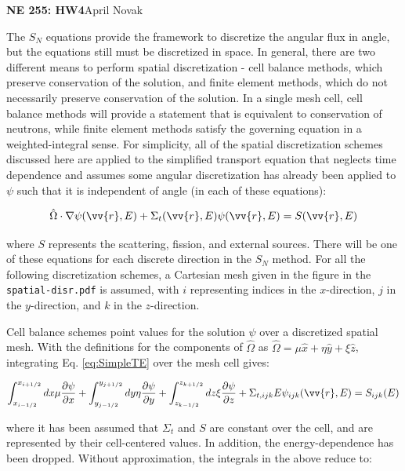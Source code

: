\documentclass[10pt]{article}
\newcommand*\circled[1]{\tikz[baseline=(char.base)]{
            \node[shape=circle,draw,inner sep=2pt] (char) {#1};}}
\begin{document}
\textbf{NE 255: HW4}\hfill April Novak\newline

\circled{1} The \(S_N\) equations provide the framework to discretize the angular flux in angle, but the equations still must be discretized in space. In general, there are two different means to perform spatial discretization - cell balance methods, which preserve conservation of the solution, and finite element methods, which do not necessarily preserve conservation of the solution. In a single mesh cell, cell balance methods will provide a statement that is equivalent to conservation of neutrons, while finite element methods satisfy the governing equation in a weighted-integral sense. For simplicity, all of the spatial discretization schemes discussed here are applied to the simplified transport equation that neglects time dependence and assumes some angular discretization has already been applied to \(\psi\) such that it is independent of angle (in each of these equations):

\begin{equation}
\label{eq:SimpleTE}
\hat{\Omega}\cdot\nabla\psi(\vv{r},E)+\Sigma_t({\vv{r},E})\psi(\vv{r},E)=S(\vv{r},E)
\end{equation}

where \(S\) represents the scattering, fission, and external sources. There will be one of these equations for each discrete direction in the \(S_N\) method. For all the following discretization schemes, a Cartesian mesh given in the figure in the \texttt{spatial-disr.pdf} is assumed, with \(i\) representing indices in the \(x\)-direction, \(j\) in the \(y\)-direction, and \(k\) in the \(z\)-direction.

Cell balance schemes point values for the solution \(\psi\) over a discretized spatial mesh. With the definitions for the components of \(\hat{\Omega}\) as \(\hat{\Omega}=\mu\hat{x}+\eta\hat{y}+\xi\hat{z}\), integrating Eq. \eqref{eq:SimpleTE} over the mesh cell gives:

\begin{equation}
\int_{x_{i-1/2}}^{x_{i+1/2}}dx\mu \frac{\partial \psi}{\partial x}+\int_{y_{j-1/2}}^{y_{j+1/2}}dy\eta \frac{\partial \psi}{\partial y}+\int_{z_{k-1/2}}^{z_{k+1/2}}dz\xi \frac{\partial \psi}{\partial z}+\Sigma_{t,ijk}{E}\psi_{ijk}(\vv{r},E)=S_{ijk}(E)
\end{equation}

where it has been assumed that \(\Sigma_t\) and \(S\) are constant over the cell, and are represented by their cell-centered values. In addition, the energy-dependence has been dropped. Without approximation, the integrals in the above reduce to:
\end{document}
